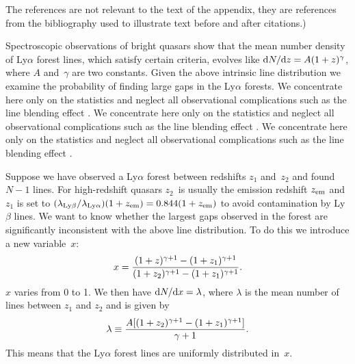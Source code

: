 \documentclass[useAMS,usenatbib, referree]{biom}
\begin{document}
The references are not relevant to the text of the
appendix, they are references from the bibliography used to
illustrate text before and after citations.)

Spectroscopic observations of bright quasars show that the mean
number density of Ly$\alpha$ forest lines, which satisfy certain
criteria, evolves like ${\mathrm{d}}N/{\mathrm{d}}z=A(1+z)^\gamma$, where
$A$ and~$\gamma$ are two constants.  Given the above intrinsic
line distribution we examine the probability of finding large gaps
in the Ly$\alpha$ forests.  We concentrate here only on the
statistics and neglect all observational complications such as the
line blending effect \citep[see][for example]{b11}. We concentrate here only on the
statistics and neglect all observational complications such as the
line blending effect \citep[see][for example]{b11}.\vadjust{\vfill\pagebreak}
 We concentrate here only on the
statistics and neglect all observational complications such as the
line blending effect \citep[see][for example]{b11}. 

Suppose we have observed a Ly$\alpha$ forest between redshifts $z_1$
and~$z_2$ and found $N-1$ lines.  For high-redshift quasars $z_2$~is
usually the emission redshift $z_{{\mathrm{em}}}$ and $z_1$ is set to
$(\lambda_{{\mathrm{Ly}}\beta}/\lambda_{{\mathrm{Ly}}\alpha})(1+z_{{\mathrm{em}}})=0.844
(1+z_{{\mathrm{em}}})$ to avoid contamination by Ly$\beta$ lines.  We
want to know whether the largest gaps observed in the forest are
significantly inconsistent with the above line distribution.  To do
this we introduce a new variable~$x$:\vspace*{1.5pt}
%
\[
x={(1+z)^{\gamma+1}-(1+z_1)^{\gamma+1} \over
     (1+z_2)^{\gamma+1}-(1+z_1)^{\gamma+1}}.
\]
\vskip1.5pt%
$x$ varies from 0 to 1.  We then have ${\mathrm{d}}N/{\mathrm{d}}x=\lambda$,
where $\lambda$ is the mean number of lines between $z_1$ and $z_2$
and is given by
%
\[%
\lambda\equiv{A[(1+z_2)^{\gamma+1}-(1+z_1)^{\gamma+1}]\over\gamma+1}.
\]
%
This means that the Ly$\alpha$ forest lines are uniformly
distributed in~$x$.
%
\label{lastpage}
\end{document}
